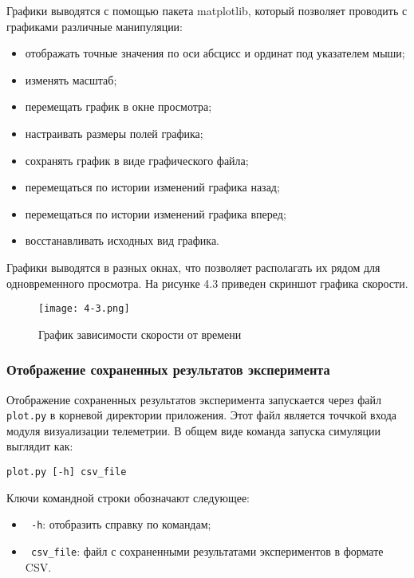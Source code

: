Графики выводятся с помощью пакета matplotlib, который позволяет проводить с графиками различные манипуляции:

\begin{itemize}
	\item отображать точные значения по оси абсцисс и ординат под указателем мыши;
	\item изменять масштаб;
	\item перемещать график в окне просмотра;
	\item настраивать размеры полей графика;
	\item сохранять график в виде графического файла;
	\item перемещаться по истории изменений графика назад;
	\item перемещаться по истории изменений графика вперед;
	\item восстанавливать исходных вид графика.
\end{itemize}


Графики выводятся в разных окнах, что позволяет располагать их рядом для одновременного просмотра. На рисунке 4.3 приведен скриншот графика скорости.

\begin{figure}[ht]
  \centering
  \texttt{[image: 4-3.png]}
  \caption{График зависимости скорости от времени }
\end{figure}


\subsubsection{ Отображение сохраненных результатов эксперимента }

Отображение сохраненных результатов эксперимента запускается через файл \lstinline!plot.py! в корневой директории приложения. Этот файл является точчкой входа модуля визуализации телеметрии. В общем виде команда запуска симуляции выглядит как:


\begin{lstlisting}[style=pythonstyle,caption={  }, label=lst:func:1]
  plot.py [-h] csv_file
\end{lstlisting}

Ключи командной строки обозначают следующее:

\begin{itemize}
	\item \lstinline! -h!: отобразить справку по командам;
	\item \lstinline! csv_file!: файл с сохраненными результатами экспериментов в формате CSV.
\end{itemize}


